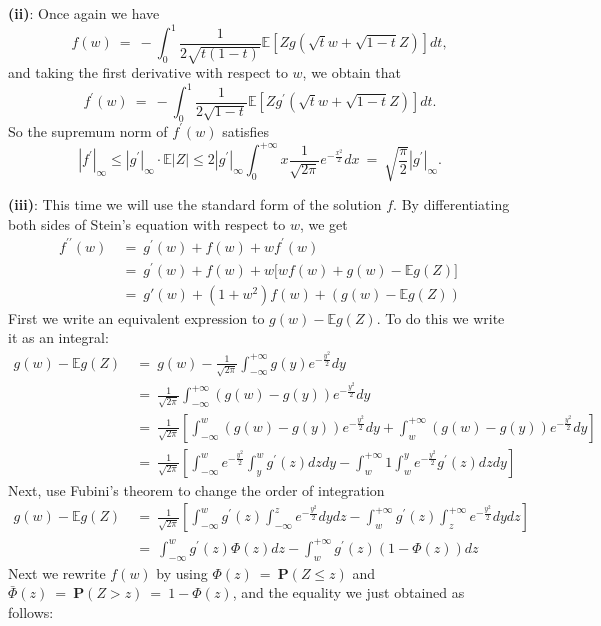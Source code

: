 \documentclass[12pt]{article}
\newcommand{\e}{\mathbb{E}}
\newcommand{\eq }{\: = \:}
\theoremstyle{nonumberplain}
\begin{document}
\textbf{(ii)}: Once again we have
$$
f(w)\eq -\int_{0}^{1} \frac{1}{2\sqrt{t(1-t)}}  \mathbb{E}[Zg(\sqrt{t}w+\sqrt{1-t}Z)]dt,
$$
and taking the first derivative with respect to $w$, we obtain that
$$
f^{\prime}(w)\eq -\int_{0}^{1} \frac{1}{2\sqrt{1-t}} \mathbb{E}[Zg^{\prime}(\sqrt{t}w+\sqrt{1-t}Z)]dt.
$$
So the supremum norm of $f^{\prime}(w)$ satisfies
$$
|f^{\prime}|_{\infty} \leq |g^{\prime}|_{\infty}\cdot \mathbb{E}|Z|\leq 2|g^{\prime}|_{\infty} \int_{0}^{+\infty} x\frac{1}{\sqrt{2\pi}} e^{-\frac{x^{2}}{2}}dx \eq  \sqrt{\frac{\pi}{2}}|g^{\prime}|_{\infty}.
$$

\textbf{(iii)}: This time we will use the standard form of the solution $f$. By differentiating both sides of Stein's equation with respect to $w$, we get
\begin{align*}
f^{\prime \prime}(w)&\eq g^{\prime}(w)+f(w)+wf^{\prime}(w)\\
&\eq g^{\prime}(w)+f(w)+w\bigl[wf(w)+g(w)-\mathbb{E}g(Z)\bigr] \\
& \eq g'(w) + (1 + w^2)f(w) + (g(w) - \e g(Z))
\end{align*}
First we write an equivalent expression to $g(w)-\mathbb{E}g(Z)$. To do this we write it as an integral:
\begin{align*}
g(w)-\mathbb{E}g(Z)&\eq g(w)-\frac{1}{\sqrt{2\pi}} \int_{-\infty}^{+\infty} g(y)e^{-\frac{y^{2}}{2}}dy\\
&\eq \frac{1}{\sqrt{2\pi}} \int_{-\infty}^{+\infty} (g(w)-g(y))e^{-\frac{y^{2}}{2}}dy\\
&\eq \frac{1}{\sqrt{2\pi}}[\int_{-\infty}^{w} (g(w)-g(y))e^{-\frac{y^{2}}{2}}dy +\int_{w}^{+\infty} (g(w)-g(y))e^{-\frac{y^{2}}{2}}dy]\\
&\eq \frac{1}{\sqrt{2\pi}}[\int_{-\infty}^{w} e^{-\frac{y^{2}}{2}} \int_{y}^{w} g^{\prime}(z)dzdy - \int_{w}^{+\infty} 1 \int_{w}^{y} e^{-\frac{y^{2}}{2}}g^{\prime}(z)dzdy]
\end{align*}
Next, use Fubini's theorem to change the order of integration
\begin{align*}
g(w)-\mathbb{E}g(Z)&\eq \frac{1}{\sqrt{2\pi}}[\int_{-\infty}^{w} g^{\prime}(z) \int_{-\infty}^{z} e^{-\frac{y^{2}}{2}}dydz - \int_{w}^{+\infty} g^{\prime}(z) \int_{z}^{+\infty} e^{-\frac{y^{2}}{2}}dydz]\\
&\eq \int_{-\infty}^{w} g^{\prime}(z)\Phi(z)dz - \int_{w}^{+\infty} g^{\prime}(z)(1-\Phi(z))dz
\end{align*}
Next we rewrite $f(w)$ by using $\Phi(z)\eq \textbf{P}(Z\leq z)$ and $\bar{\Phi}(z)\eq \textbf{P}(Z > z) \eq 1 - \Phi(z)$, and the equality we just obtained as follows:
\end{document}
